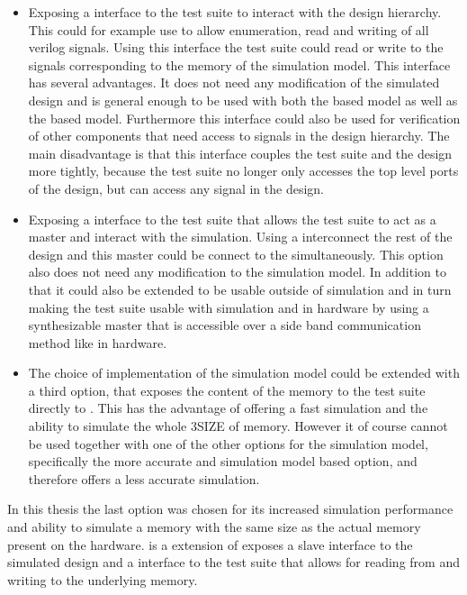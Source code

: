 \begin{itemize}
  \item Exposing a interface to the test suite to interact with the design hierarchy. This could for example use \VPI{} to allow enumeration, read and writing of all verilog signals. Using this interface the test suite could read or write to the signals corresponding to the memory of the \DRAM{} simulation model. This interface has several advantages. It does not need any modification of the simulated design and is general enough to be used with both the \AXIBRAMController{} based model as well as the \MIG{} based model. Furthermore this interface could also be used for verification of other components that need access to signals in the design hierarchy. The main disadvantage is that this interface couples the test suite and the \FPGA{} design more tightly, because the test suite no longer only accesses the top level ports of the design, but can access any signal in the \FPGA{} design.
  \item Exposing a interface to the test suite that allows the test suite to act as a \AXI{} master and interact with the simulation. Using a \AXI{} interconnect the rest of the \FPGA{} design and this \AXI{} master could be connect to the \AXI{} \DRAM{} simultaneously. This option also does not need any modification to the \AXI{} \DRAM{} simulation model. In addition to that it could also be extended to be usable outside of simulation and in turn making the test suite usable with simulation and in hardware by using a synthesizable \AXI{} master that is accessible over a side band communication method like \JTAG{} in hardware.
  \item The choice of implementation of the \AXI{} \DRAM{} simulation model could be extended with a third option, that exposes the content of the memory to the test suite directly to \flange{}. This has the advantage of offering a fast simulation and the ability to simulate the whole \DDR3SIZE{} of memory. However it of course cannot be used together with one of the other options for the \AXI{} \DRAM{} simulation model, specifically the more accurate \MIG{} and \DDR{} simulation model based option, and therefore offers a less accurate simulation.
\end{itemize}
In this thesis the last option was chosen for its increased simulation performance and ability to simulate a memory with the same size as the actual memory present on the hardware. \flangedram{} is a extension of \flange{} exposes a \AXI{} slave interface to the simulated \FPGA{} design and a interface to the test suite that allows for reading from and writing to the underlying memory.

